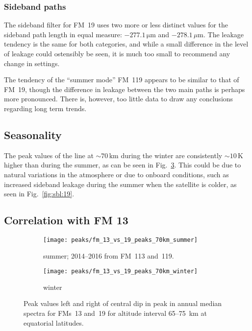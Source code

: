 \subsubsection{Sideband paths}
\label{FM19:sbpath}
The sideband filter for FM~19 uses two more or less distinct values for the
sideband path length in equal measure: $-277.1\,\mathrm{\mu m}$ and
$-278.1\,\mu\mathrm{m}$.  The leakage tendency is the same for both categories,
and while a small difference in the level of leakage could ostensibly be seen,
it is much too small to recommend any change in settings.

The tendency of the ``summer mode'' FM~119 appears to be similar to that of
FM~19, though the difference in leakage between the two main paths is perhaps
more pronounced.  There is, however, too little data to draw any conclusions
regarding long term trends.

\subsection{Seasonality}
\label{FM19:seasonality}
The peak values of the  line at $\sim70\,\mathrm{km}$ during the
winter are consistently $\sim10\,\mathrm{K}$ higher than during the summer, as
can be seen in Fig.~\ref{fig:peaks:13v19}.  This could be due to natural
variations in the atmosphere or due to onboard conditions, such as increased
sideband leakage during the summer when the satellite is colder, as seen in
Fig.~\ref{fig:sbl:19}.


\subsection{Correlation with FM 13}
\label{FM19:FM13:corr}

\begin{figure}[ht]
    \centering
    \begin{subfigure}[b]{0.9545\textwidth}
        \texttt{[image: peaks/fm\_13\_vs\_19\_peaks\_70km\_summer]}
        \caption{summer; 2014--2016 from FM~113 and~119.
            }\label{fig:peaks:13v19:summer}
    \end{subfigure}
    \begin{subfigure}[b]{0.9545\textwidth}
        \texttt{[image: peaks/fm\_13\_vs\_19\_peaks\_70km\_winter]}
        \caption{winter}\label{fig:peaks:13v19:winter}
    \end{subfigure}
    \caption{Peak values left and right of central dip in  peak in
        annual median spectra for FMs~13 and~19 for altitude interval
        65--75~km at equatorial latitudes.
    }\label{fig:peaks:13v19}
\end{figure}

